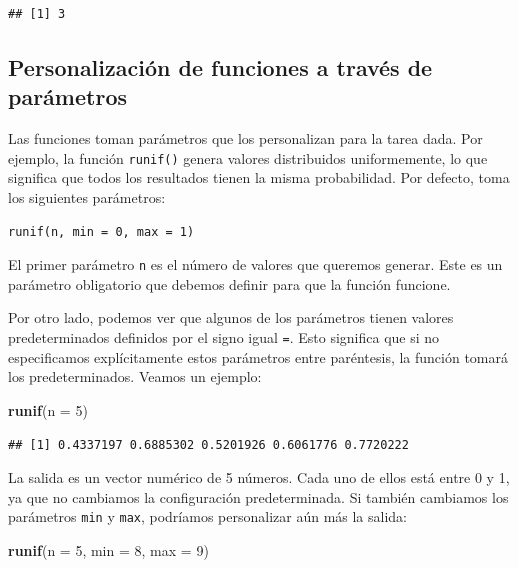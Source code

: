 \documentclass[
]{book}
\newenvironment{Shaded}{\begin{snugshade}}{\end{snugshade}}
\newcommand{\DataTypeTok}[1]{\textcolor[rgb]{0.13,0.29,0.53}{#1}}
\newcommand{\DecValTok}[1]{\textcolor[rgb]{0.00,0.00,0.81}{#1}}
\newcommand{\KeywordTok}[1]{\textcolor[rgb]{0.13,0.29,0.53}{\textbf{#1}}}
\newcommand{\NormalTok}[1]{#1}
\begin{document}
\begin{verbatim}
## [1] 3
\end{verbatim}

\hypertarget{personalizaciuxf3n-de-funciones-a-travuxe9s-de-paruxe1metros}{%
\subsection{Personalización de funciones a través de parámetros}\label{personalizaciuxf3n-de-funciones-a-travuxe9s-de-paruxe1metros}}

Las funciones toman parámetros que los personalizan para la tarea dada. Por ejemplo, la función \texttt{runif()} genera valores distribuidos uniformemente, lo que significa que todos los resultados tienen la misma probabilidad. Por defecto, toma los siguientes parámetros:

\begin{verbatim}
runif(n, min = 0, max = 1)
\end{verbatim}

El primer parámetro \texttt{n} es el número de valores que queremos generar. Este es un parámetro obligatorio que debemos definir para que la función funcione.

Por otro lado, podemos ver que algunos de los parámetros tienen valores predeterminados definidos por el signo igual \texttt{=}. Esto significa que si no especificamos explícitamente estos parámetros entre paréntesis, la función tomará los predeterminados. Veamos un ejemplo:

\begin{Shaded}
\begin{Highlighting}[]
\KeywordTok{runif}\NormalTok{(}\DataTypeTok{n =} \DecValTok{5}\NormalTok{)}
\end{Highlighting}
\end{Shaded}

\begin{verbatim}
## [1] 0.4337197 0.6885302 0.5201926 0.6061776 0.7720222
\end{verbatim}

La salida es un vector numérico de 5 números. Cada uno de ellos está entre 0 y 1, ya que no cambiamos la configuración predeterminada. Si también cambiamos los parámetros \texttt{min} y \texttt{max}, podríamos personalizar aún más la salida:

\begin{Shaded}
\begin{Highlighting}[]
\KeywordTok{runif}\NormalTok{(}\DataTypeTok{n =} \DecValTok{5}\NormalTok{, }\DataTypeTok{min =} \DecValTok{8}\NormalTok{, }\DataTypeTok{max =} \DecValTok{9}\NormalTok{)}
\end{Highlighting}
\end{Shaded}
\end{document}
